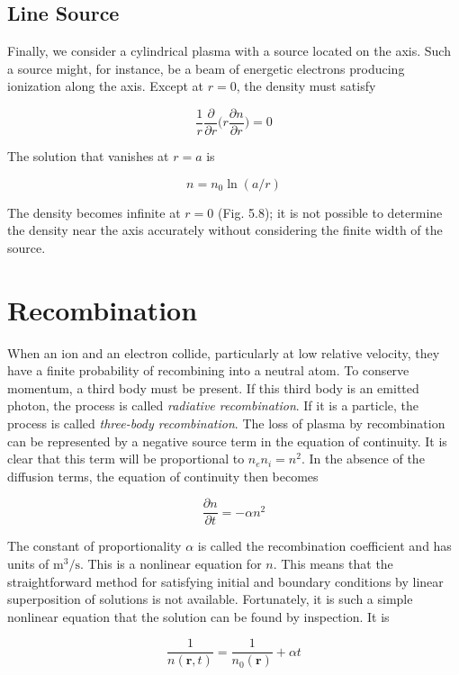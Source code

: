 \documentclass[
  notoc %
]{tufte-book}
\begin{document}
\hypertarget{line-source}{%
\subsection{Line Source}\label{line-source}}

Finally, we consider a cylindrical plasma with a source located on the
axis. Such a source might, for instance, be a beam of energetic
electrons producing ionization along the axis. Except at \(r=0\), the
density must satisfy

\[
\frac{1}{r}\frac{\partial}{\partial r}\Big(r\frac{\partial n}{\partial r}\Big) = 0
\]

The solution that vanishes at \(r=a\) is

\[
n = n_0 \ln(a/r)
\]

The density becomes infinite at \(r=0\) (Fig. 5.8); it is not possible
to determine the density near the axis accurately without considering
the finite width of the source.

\hypertarget{recombination}{%
\section{Recombination}\label{recombination}}

When an ion and an electron collide, particularly at low relative
velocity, they have a finite probability of recombining into a neutral
atom. To conserve momentum, a third body must be present. If this third
body is an emitted photon, the process is called \emph{radiative
recombination}. If it is a particle, the process is called
\emph{three-body recombination}. The loss of plasma by recombination can
be represented by a negative source term in the equation of continuity.
It is clear that this term will be proportional to \(n_en_i=n^2\). In
the absence of the diffusion terms, the equation of continuity then
becomes

\[
\frac{\partial n}{\partial t} = -\alpha n^2
\]

The constant of proportionality \(\alpha\) is called the recombination
coefficient and has units of \(\text{m}^3/\text{s}\). This is a
nonlinear equation for \(n\). This means that the straightforward method
for satisfying initial and boundary conditions by linear superposition
of solutions is not available. Fortunately, it is such a simple
nonlinear equation that the solution can be found by inspection. It is

\[
\frac{1}{n(\mathbf{r},t)} = \frac{1}{n_0(\mathbf{r})} + \alpha t
\]
\end{document}
